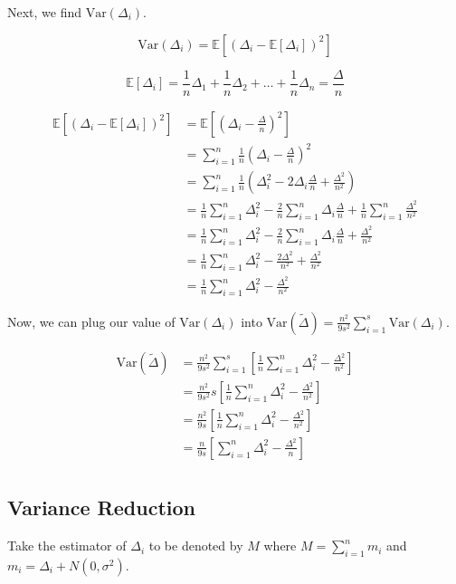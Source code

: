 \documentclass[11pt]{article}
\begin{document}
Next, we find $\mathrm{Var}(\Delta_i)$.

\[
\mathrm{Var}(\Delta_i) = \mathbb{E}[(\Delta_i - \mathbb{E}[\Delta_i])^2]
\]

\[
\mathbb{E}[\Delta_i] = \frac{1}{n} \Delta_1 + \frac{1}{n} \Delta_2 + \ldots + \frac{1}{n} \Delta_n = \frac{\Delta}{n}
\]

\[
\begin{aligned}
\mathbb{E}[(\Delta_i - \mathbb{E}[\Delta_i])^2] &= \mathbb{E}[(\Delta_i - \frac{\Delta}{n})^2] \\
&= \sum_{i = 1}^{n} \frac{1}{n} (\Delta_i - \frac{\Delta}{n})^2 \\
&= \sum_{i = 1}^{n} \frac{1}{n} (\Delta_i^2 - 2 \Delta_i \frac{\Delta}{n} + \frac{\Delta^2}{n^2}) \\
&= \frac{1}{n} \sum_{i = 1}^{n} \Delta_i^2 - \frac{2}{n} \sum_{i = 1}^{n} \Delta_i \frac{\Delta}{n} + \frac{1}{n} \sum_{i = 1}^{n} \frac{\Delta^2}{n^2} \\
&= \frac{1}{n} \sum_{i = 1}^{n} \Delta_i^2 - \frac{2}{n} \sum_{i = 1}^{n} \Delta_i \frac{\Delta}{n} + \frac{\Delta^2}{n^2} \\
&= \frac{1}{n} \sum_{i = 1}^{n} \Delta_i^2 - \frac{2\Delta^2}{n^2} + \frac{\Delta^2}{n^2} \\
&= \frac{1}{n} \sum_{i = 1}^{n} \Delta_i^2 - \frac{\Delta^2}{n^2}
\end{aligned}
\]

Now, we can plug our value of $\mathrm{Var}(\Delta_i)$ into $\mathrm{Var}(\tilde{\Delta}) = \frac{n^2}{9s^2} \sum_{i=1}^{s} \mathrm{Var}(\Delta_i)$.

\[
\begin{aligned}
\mathrm{Var}(\tilde{\Delta}) &= \frac{n^2}{9s^2} \sum_{i=1}^{s} [\frac{1}{n} \sum_{i = 1}^{n} \Delta_i^2 - \frac{\Delta^2}{n^2}] \\
&= \frac{n^2}{9s^2} s [\frac{1}{n} \sum_{i = 1}^{n} \Delta_i^2 - \frac{\Delta^2}{n^2}] \\
&= \frac{n^2}{9s} [\frac{1}{n} \sum_{i = 1}^{n} \Delta_i^2 - \frac{\Delta^2}{n^2}] \\
&= \frac{n}{9s} [\sum_{i = 1}^{n} \Delta_i^2 - \frac{\Delta^2}{n}] \\
\end{aligned}
\]

\subsection{Variance Reduction}

Take the estimator of $\Delta_i$ to be denoted by $M$ where $M = \sum_{i = 1}^{n} m_i$ and $m_i = \Delta_i + N(0, \sigma^2)$.
\end{document}
